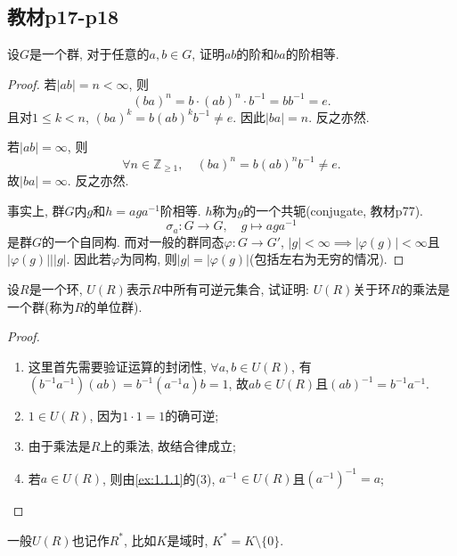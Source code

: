 \subsection{教材p17-p18}

\begin{problem}\label{ex:1.3.1}
    设$G$是一个群, 对于任意的$a, b \in G$, 证明$ab$的阶和$ba$的阶相等.
\end{problem}

\begin{proof}
    若$|ab| = n < \infty$, 则
    \[
        (ba)^n = b \cdot (ab)^n \cdot b^{-1} = bb^{-1} = e.
    \]
    且对$1 \leqslant k < n$, $(ba)^k = b(ab)^kb^{-1} \neq e$. 因此$|ba| = n$. 反之亦然.
    
    若$|ab| = \infty$, 则
    \[
        \forall n \in \mathbb{Z}_{\geqslant 1}, \quad (ba)^n = b(ab)^nb^{-1} \neq e.
    \]
    故$|ba| = \infty$. 反之亦然.

    事实上, 群$G$内$g$和$h = aga^{-1}$阶相等. $h$称为$g$的一个共轭(conjugate, 教材p77).
    \[
        \sigma_a: G \to G, \quad g \mapsto aga^{-1}
    \]
    是群$G$的一个自同构. 而对一般的群同态$\varphi: G \to G'$, $|g| < \infty \implies |\varphi(g)| < \infty$且$|\varphi(g)| \Big| |g|$. 因此若$\varphi$为同构, 则$|g| = |\varphi(g)|$(包括左右为无穷的情况).
\end{proof}

\begin{problem}\label{ex:1.3.2}
    设$R$是一个环, $U(R)$表示$R$中所有可逆元集合, 试证明: $U(R)$关于环$R$的乘法是一个群(称为$R$的单位群).
\end{problem}

\begin{proof}
    \begin{enumerate}[(1)]
        \item 这里首先需要验证运算的封闭性, $\forall a, b \in U(R)$, 有$(b^{-1}a^{-1})(ab) = b^{-1}(a^{-1}a)b = 1$, 故$ab \in U(R)$且$(ab)^{-1} = b^{-1}a^{-1}$.
        \item $1 \in U(R)$, 因为$1 \cdot 1 = 1$的确可逆;
        \item 由于乘法是$R$上的乘法, 故结合律成立;
        \item 若$a \in U(R)$, 则由\ref{ex:1.1.1}的(3), $a^{-1} \in U(R)$且$(a^{-1})^{-1} = a$;
    \end{enumerate}
\end{proof}

\begin{remark}
    一般$U(R)$也记作$R^*$, 比如$K$是域时, $K^* = K \setminus \{0\}$.
\end{remark}

